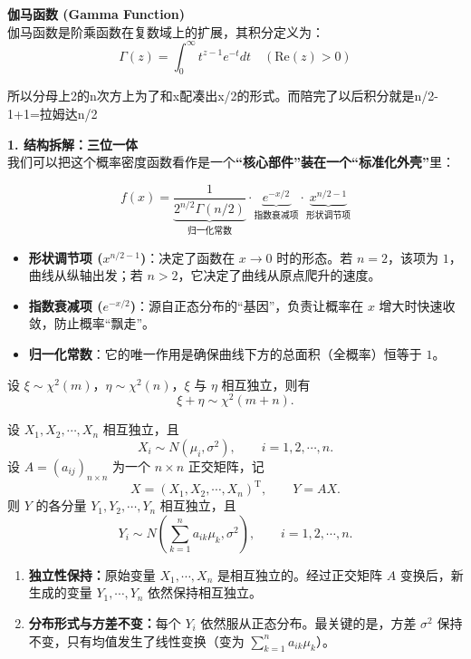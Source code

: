 \textbf{伽马函数 (Gamma Function)} \\
伽马函数是阶乘函数在复数域上的扩展，其积分定义为：
\begin{equation}
    \Gamma(z) = \int_{0}^{\infty} t^{z-1} e^{-t} dt \quad (\text{Re}(z) > 0)
\end{equation}
\begin{dxtips}
    所以分母上2的n次方上为了和x配凑出x/2的形式。而陪完了以后积分就是n/2-1+1=拉姆达n/2
\end{dxtips}
\begin{note}
    \textbf{1. 结构拆解：三位一体} \\
我们可以把这个概率密度函数看作是一个\textbf{“核心部件”装在一个“标准化外壳”}里：

\begin{equation}
    f(x) = \underbrace{\frac{1}{2^{n/2} \Gamma(n/2)}}_{\text{归一化常数}} \cdot \underbrace{e^{-x/2}}_{\text{指数衰减项}} \cdot \underbrace{x^{n/2-1}}_{\text{形状调节项}}
\end{equation}

\begin{itemize}
    \item \textbf{形状调节项 ($x^{n/2-1}$)}：决定了函数在 $x \to 0$ 时的形态。若 $n = 2$，该项为 $1$，曲线从纵轴出发；若 $n > 2$，它决定了曲线从原点爬升的速度。
    \item \textbf{指数衰减项 ($e^{-x/2}$)}：源自正态分布的“基因”，负责让概率在 $x$ 增大时快速收敛，防止概率“飘走”。
    \item \textbf{归一化常数}：它的唯一作用是确保曲线下方的总面积（全概率）恒等于 $1$。
\end{itemize}
\begin{theorem}
设 $\xi \sim \chi^2(m)$，$\eta \sim \chi^2(n)$，$\xi$ 与 $\eta$ 相互独立，则有
\[
\xi + \eta \sim \chi^2(m+n).
\]
\end{theorem}
\end{note}
\begin{lemma}
设 $X_1,X_2,\cdots,X_n$ 相互独立，且
\[
X_i\sim N(\mu_i,\sigma^2),\qquad i=1,2,\cdots,n.
\]
设 $A=(a_{ij})_{n\times n}$ 为一个 $n\times n$ 正交矩阵，记
\[
X=(X_1,X_2,\cdots,X_n)^{\mathrm T},\qquad Y=AX.
\]
则 $Y$ 的各分量 $Y_1,Y_2,\cdots,Y_n$ 相互独立，且
\[
Y_i\sim N\left(\sum_{k=1}^n a_{ik}\mu_k,\sigma^2\right),\qquad i=1,2,\cdots,n.
\]
\end{lemma}
\begin{enumerate}
    \item \textbf{独立性保持：}原始变量 $X_1,\cdots,X_n$ 是相互独立的。经过正交矩阵 $A$ 变换后，新生成的变量 $Y_1,\cdots,Y_n$ 依然保持相互独立。
    
    \item \textbf{分布形式与方差不变：}每个 $Y_i$ 依然服从正态分布。最关键的是，方差 $\sigma^2$ 保持不变，只有均值发生了线性变换（变为 $\sum_{k=1}^n a_{ik}\mu_k$）。
\end{enumerate}
